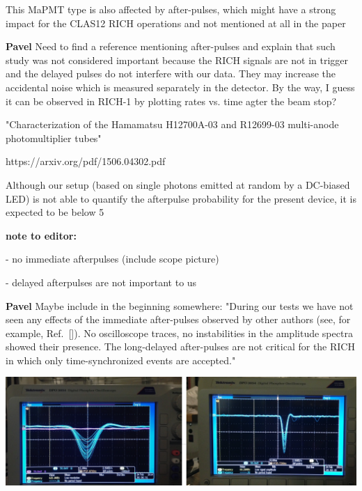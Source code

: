 \documentclass[11pt]{report}
\begin{document}
\begin{tcolorbox}[enlarge top by=2em,colbacktitle=red!60!white,colframe=black!80!white,left=0pt,right=0pt,top=0pt,bottom=0pt,boxrule=0.3pt,title=\bfseries2.04]
This MaPMT type is also affected by after-pulses, which might have a strong impact for the CLAS12 RICH operations and not mentioned at all in the paper
\end{tcolorbox}

{\centering
\begin{tcolorbox}[enlarge top by=2em,colbacktitle=green!60!white,colframe=black!80!white,width=0.9\linewidth,left=30pt,right=30pt,top=10pt,bottom=10pt,boxrule=0.3pt,title=\bfseries our draft remarks]

{\bfseries Pavel}
Need to find a reference mentioning after-pulses and explain that such study was not considered important because the RICH signals are not in trigger and the delayed pulses do not interfere with our data. They may increase the accidental noise which is measured separately in the detector. By the way, I guess it can be observed in RICH-1 by plotting rates vs. time agter the beam stop? 

"Characterization of the Hamamatsu H12700A-03 and R12699-03 multi-anode photomultiplier tubes"


https://arxiv.org/pdf/1506.04302.pdf

Although our setup (based on single photons emitted at random by a DC-biased LED) is not able to quantify the afterpulse probability for the present device, it is expected to be below 5%

{\bfseries note to editor:}

- no immediate afterpulses (include scope picture)

- delayed afterpulses are not important to us

{\bfseries Pavel}
Maybe include in the beginning somewhere: "During our tests we have not  seen any effects of the immediate after-pulses observed by other authors (see, for example, Ref.~[]). No oscilloscope traces, no instabilities in the amplitude spectra showed their presence. The long-delayed after-pulses are not critical for the RICH in which only time-synchronized events are accepted."

\includegraphics[width=0.7\linewidth]{round1/afterpulses.png}

\end{tcolorbox}
}
\end{document}
